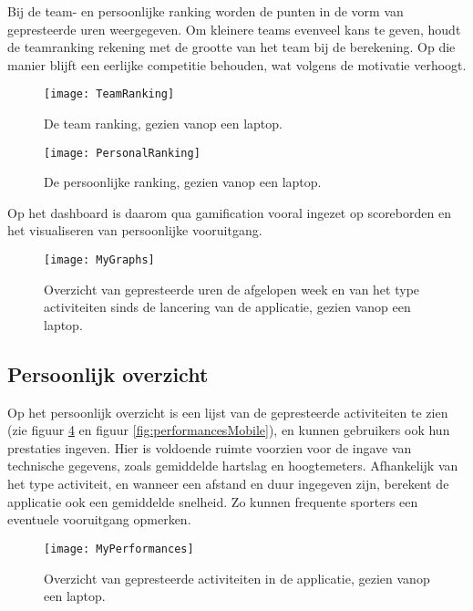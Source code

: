 Bij de team- en persoonlijke ranking worden de punten in de vorm van gepresteerde uren weergegeven. Om kleinere teams evenveel kans te geven, houdt de teamranking rekening met de grootte van het team bij de berekening. Op die manier blijft een eerlijke competitie behouden, wat volgens \textcite{Ivanova2019} de motivatie verhoogt.

\begin{figure}[h]
    \caption[Team ranking]{De team ranking, gezien vanop een laptop.}
    \texttt{[image: TeamRanking]}
    \label{fig:teamRanking}
\end{figure}

\begin{figure}[h]
    \caption[Persoonlijke ranking]{De persoonlijke ranking, gezien vanop een laptop.}
    \texttt{[image: PersonalRanking]}
    \label{fig:personalRanking}
\end{figure}

Op het dashboard is daarom qua gamification vooral ingezet op scoreborden en het visualiseren van persoonlijke vooruitgang.

\begin{figure}[h]
    \caption[Overzicht prestaties dashboard website]{Overzicht van gepresteerde uren de afgelopen week en van het type activiteiten sinds de lancering van de applicatie, gezien vanop een laptop.}
    \texttt{[image: MyGraphs]}
    \label{fig:graphs}
\end{figure}

\subsection{Persoonlijk overzicht}
Op het persoonlijk overzicht is een lijst van de gepresteerde activiteiten te zien (zie figuur \ref{fig:performances} en figuur \ref{fig:performancesMobile}), en kunnen gebruikers ook hun prestaties ingeven. Hier is voldoende ruimte voorzien voor de ingave van technische gegevens, zoals gemiddelde hartslag en hoogtemeters. Afhankelijk van het type activiteit, en wanneer een afstand en duur ingegeven zijn, berekent de applicatie ook een gemiddelde snelheid. Zo kunnen frequente sporters een eventuele vooruitgang opmerken.

\begin{figure}[h]
    \caption[Overzicht activiteiten website]{Overzicht van gepresteerde activiteiten in de applicatie, gezien vanop een laptop.}
    \texttt{[image: MyPerformances]}
    \label{fig:performances}
\end{figure}

